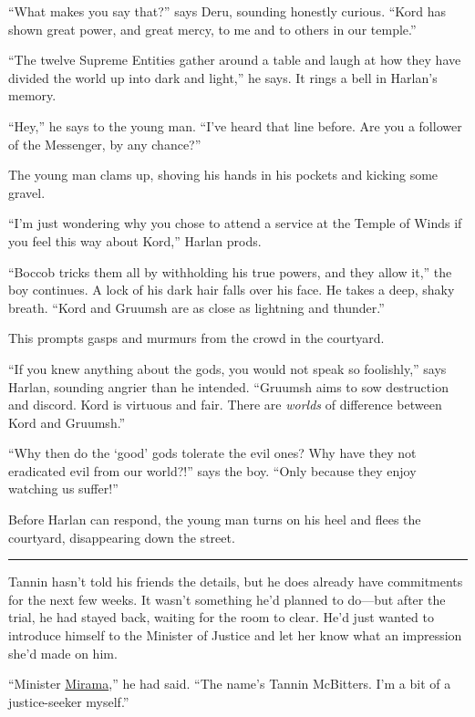 \documentclass[smalldemyvopaper,11pt,twoside,onecolumn,openright,extrafontsizes]{memoir}
\begin{document}
``What makes you say that?'' says Deru, sounding honestly curious.
``Kord has shown great power, and great mercy, to me and to others in
our temple.''

``The twelve Supreme Entities gather around a table and laugh at how
they have divided the world up into dark and light,'' he says. It rings
a bell in Harlan's memory.

``Hey,'' he says to the young man. ``I've heard that line before. Are
you a follower of the Messenger, by any chance?''

The young man clams up, shoving his hands in his pockets and kicking
some gravel.

``I'm just wondering why you chose to attend a service at the Temple of
Winds if you feel this way about Kord,'' Harlan prods.

``Boccob tricks them all by withholding his true powers, and they allow
it,'' the boy continues. A lock of his dark hair falls over his face. He
takes a deep, shaky breath. ``Kord and Gruumsh are as close as lightning
and thunder.''

This prompts gasps and murmurs from the crowd in the courtyard.

``If you knew anything about the gods, you would not speak so
foolishly,'' says Harlan, sounding angrier than he intended. ``Gruumsh
aims to sow destruction and discord. Kord is virtuous and fair. There
are \emph{worlds} of difference between Kord and Gruumsh.''

``Why then do the `good' gods tolerate the evil ones? Why have they not
eradicated evil from our world?!'' says the boy. ``Only because they
enjoy watching us suffer!''

Before Harlan can respond, the young man turns on his heel and flees the
courtyard, disappearing down the street.

\begin{center}\rule{0.5\linewidth}{\linethickness}\end{center}

Tannin hasn't told his friends the details, but he does already have
commitments for the next few weeks. It wasn't something he'd planned to
do---but after the trial, he had stayed back, waiting for the room to
clear. He'd just wanted to introduce himself to the Minister of Justice
and let her know what an impression she'd made on him.

``Minister \href{/characters/mirama/}{Mirama},'' he had said. ``The
name's Tannin McBitters. I'm a bit of a justice-seeker myself.''
\end{document}
